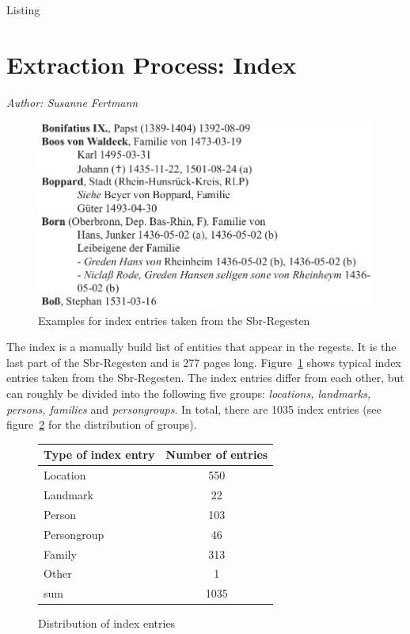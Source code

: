 Listing\section{Extraction Process: Index}
\label{sec:index}

\emph{Author: Susanne Fertmann} \\

\begin{figure}[h]
  \centering
  \includegraphics[scale=0.3]{img/index-examples}
  \caption{Examples for index entries taken from the Sbr-Regesten}
  \label{fig:index-examples}
\end{figure}
The index is a manually build list of entities that appear in the regests. It is the last part of the Sbr-Regesten and is 277 pages long. Figure~\ref{fig:index-examples} shows typical index entries taken from the Sbr-Regesten. The index entries differ from each other, but can roughly be divided into the following five groups: \textit{locations, landmarks, persons, families} and \textit{persongroups}. In total, there are 1035 index entries (see figure~\ref{fig:type-table} for the distribution of groups). 

\begin{figure}[h]
\centering
\begin{tabular}{|l|c|}
\hline
Type of index entry & Number of entries  \\
\hline
Location            & 550 \\
Landmark            & 22  \\
Person              & 103 \\
Persongroup         & 46  \\
Family              & 313 \\
Other               & 1   \\
\hline
sum         & 1035\\
\hline
\end{tabular} 
\caption{Distribution of index entries}
\label{fig:type-table}
\end{figure}

